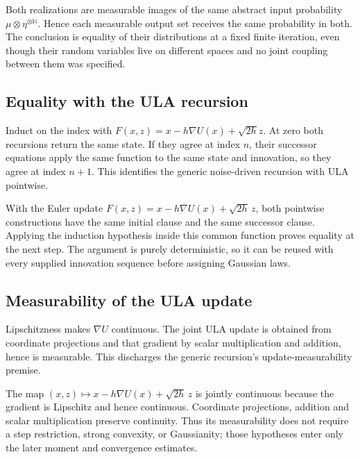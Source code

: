 \documentclass[11pt,a4paper]{article}
\begin{document}
Both realizations are measurable images of the same abstract input probability \(\mu\otimes\eta^{\otimes\mathbb N}\). Hence each measurable output set receives the same probability in both. The conclusion is equality of their distributions at a fixed finite iteration, even though their random variables live on different spaces and no joint coupling between them was specified.


\subsection{\texorpdfstring{Equality with the ULA recursion}{Equality with the ULA recursion}}


Induct on the index with \(F(x,z)=x-h\nabla U(x)+\sqrt{2h}z\). At zero both recursions return the same state. If they agree at index \(n\), their successor equations apply the same function to the same state and innovation, so they agree at index \(n+1\). This identifies the generic noise-driven recursion with ULA pointwise.



With the Euler update \(F(x,z)=x-h\nabla U(x)+\sqrt{2h}\,z\), both pointwise constructions have the same initial clause and the same successor clause. Applying the induction hypothesis inside this common function proves equality at the next step. The argument is purely deterministic, so it can be reused with every supplied innovation sequence before assigning Gaussian laws.


\subsection{\texorpdfstring{Measurability of the ULA update}{Measurability of the ULA update}}


Lipschitzness makes \(\nabla U\) continuous. The joint ULA update is obtained from coordinate projections and that gradient by scalar multiplication and addition, hence is measurable. This discharges the generic recursion's update-measurability premise.



The map \((x,z)\mapsto x-h\nabla U(x)+\sqrt{2h}\,z\) is jointly continuous because the gradient is Lipschitz and hence continuous. Coordinate projections, addition and scalar multiplication preserve continuity. Thus its measurability does not require a step restriction, strong convexity, or Gaussianity; those hypotheses enter only the later moment and convergence estimates.
\end{document}
